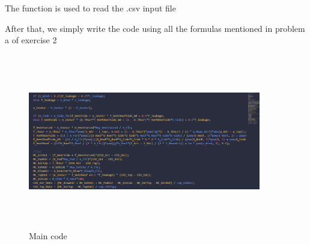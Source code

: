 The function  is used to read the .csv input file

After that, we simply write the code using all the formulas mentioned in problem a of exercise 2

\begin{figure}[h]
\centering
    \includegraphics[width = 4in, height = 3in]{Code/Pic/ex2_code.png}
    \caption{Main code}
    \label{fig:my_label}
\end{figure}








